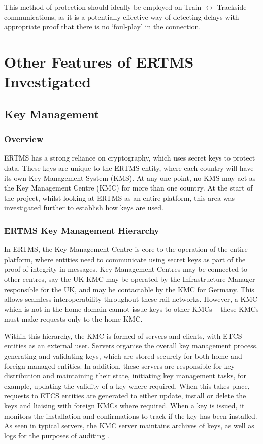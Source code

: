 \documentclass[twoside,11pt,a4paper]{article}
\begin{document}
This method of protection should ideally be employed on Train $\leftrightarrow$ Trackside communications, as it is a potentially effective way of detecting delays with appropriate proof that there is no `foul-play' in the connection.

\clearpage

\section{Other Features of ERTMS Investigated}
\subsection{Key Management}
\subsubsection{Overview}
ERTMS has a strong reliance on cryptography, which uses secret keys to protect data. These keys are unique to the ERTMS entity, where each country will have its own Key Management System (KMS). At any one point, no KMS may act as the Key Management Centre (KMC) for more than one country. At the start of the project, whilst looking at ERTMS as an entire platform, this area was investigated further to establish how keys are used.

\subsubsection{ERTMS Key Management Hierarchy}
In ERTMS, the Key Management Centre is core to the operation of the entire platform, where entities need to communicate using secret keys as part of the proof of integrity in messages. Key Management Centres may be connected to other centres, say the UK KMC may be operated by the Infrastructure Manager responsible for the UK, and may be contactable by the KMC for Germany. This allows seamless interoperability throughout these rail networks. However, a KMC which is not in the home domain cannot issue keys to other KMCs -- these KMCs must make requests only to the home KMC.

Within this hierarchy, the KMC is formed of servers and clients, with ETCS entities as an external user. Servers organise the overall key management process, generating and validating keys, which are stored securely for both home and foreign managed entities. In addition, these servers are responsible for key distribution and maintaining their state, initiating key management tasks, for example, updating the validity of a key where required. When this takes place, requests to ETCS entities are generated to either update, install or delete the keys and liaising with foreign KMCs where required. When a key is issued, it monitors the installation and confirmations to track if the key has been installed. As seen in typical servers, the KMC server maintains archives of keys, as well as logs for the purposes of auditing \citep{KPMG13a}.
\end{document}
